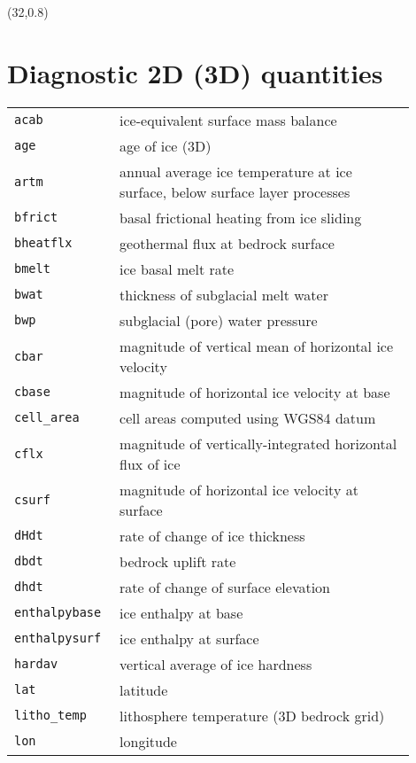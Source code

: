 \documentclass[landscape]{article}
\begin{document}
\begin{textblock}{15}
\end{textblock}

\begin{textblock}{15}(32,0.8)
\section{Diagnostic 2D (3D) quantities}
\label{sec:diagnostics}
\begin{tabular}{@{}p{0.2\linewidth}p{0.7\linewidth}@{}}
  \texttt{acab} &  ice-equivalent surface mass balance\\
  \texttt{age} &  age of ice (3D) \\
  \texttt{artm} &  annual average ice temperature at ice surface, below surface layer processes\\
  \texttt{bfrict} &  basal frictional heating from ice sliding \\
  \texttt{bheatflx} &  geothermal flux at bedrock surface \\
  \texttt{bmelt} &  ice basal melt rate\\
  \texttt{bwat} &  thickness of subglacial melt water \\
  \texttt{bwp} &  subglacial (pore) water pressure \\
  \texttt{cbar} &  magnitude of vertical mean of horizontal ice velocity \\
  \texttt{cbase} &  magnitude of horizontal ice velocity at base\\
  \texttt{cell_area} & cell areas computed using WGS84 datum\\
  \texttt{cflx} &  magnitude of vertically-integrated horizontal flux of ice \\
  \texttt{csurf} &  magnitude of horizontal ice velocity at surface \\
  \texttt{dHdt} &  rate of change of ice thickness \\
  \texttt{dbdt} &  bedrock uplift rate \\
  \texttt{dhdt} &  rate of change of surface elevation \\
  \texttt{enthalpybase} &  ice enthalpy at base\\
  \texttt{enthalpysurf} &  ice enthalpy at surface\\
  \texttt{hardav} &  vertical average of ice hardness \\
  \texttt{lat} &  latitude \\
  \texttt{litho_temp} &  lithosphere temperature (3D bedrock grid)\\
  \texttt{lon} &  longitude \\

\end{tabular}
\end{textblock}
\end{document}
